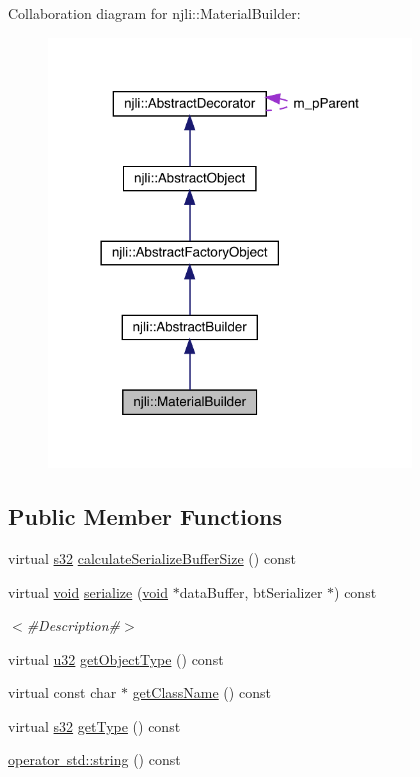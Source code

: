 Collaboration diagram for njli\+:\+:Material\+Builder\+:\nopagebreak
\begin{figure}[H]
\begin{center}
\leavevmode
\includegraphics[width=273pt]{classnjli_1_1_material_builder__coll__graph}
\end{center}
\end{figure}
\subsection*{Public Member Functions}
\begin{DoxyCompactItemize}
\item 
virtual \mbox{\hyperlink{_util_8h_aa62c75d314a0d1f37f79c4b73b2292e2}{s32}} \mbox{\hyperlink{classnjli_1_1_material_builder_ac16a0c308e735dd3da244b1dc1c9f284}{calculate\+Serialize\+Buffer\+Size}} () const
\item 
virtual \mbox{\hyperlink{_thread_8h_af1e856da2e658414cb2456cb6f7ebc66}{void}} \mbox{\hyperlink{classnjli_1_1_material_builder_a469bb521d641ccf253538c4d0e914f58}{serialize}} (\mbox{\hyperlink{_thread_8h_af1e856da2e658414cb2456cb6f7ebc66}{void}} $\ast$data\+Buffer, bt\+Serializer $\ast$) const
\begin{DoxyCompactList}\small\item\em $<$\#\+Description\#$>$ \end{DoxyCompactList}\item 
virtual \mbox{\hyperlink{_util_8h_a10e94b422ef0c20dcdec20d31a1f5049}{u32}} \mbox{\hyperlink{classnjli_1_1_material_builder_acc744b4d414edcf669b6aacfc11573c4}{get\+Object\+Type}} () const
\item 
virtual const char $\ast$ \mbox{\hyperlink{classnjli_1_1_material_builder_a7114856dcf01d474cab30bfd63e66930}{get\+Class\+Name}} () const
\item 
virtual \mbox{\hyperlink{_util_8h_aa62c75d314a0d1f37f79c4b73b2292e2}{s32}} \mbox{\hyperlink{classnjli_1_1_material_builder_aeaf990186fd43140af8263fb04518693}{get\+Type}} () const
\item 
\mbox{\hyperlink{classnjli_1_1_material_builder_a372ab364d0d091f6460f91ff10251819}{operator std\+::string}} () const
\end{DoxyCompactItemize}
